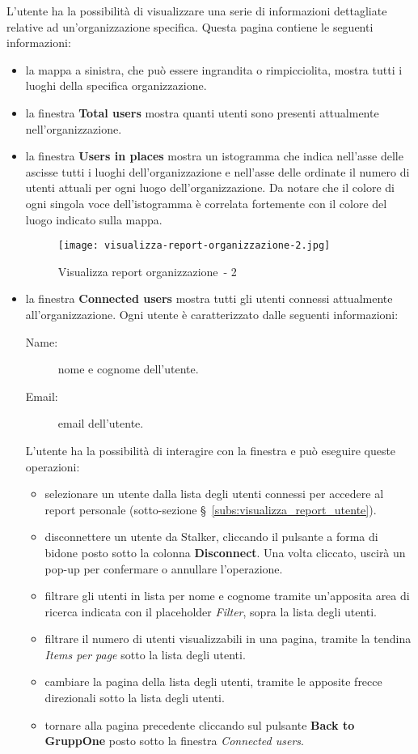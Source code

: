 \documentclass[../manuale-utente.tex]{subfiles}
\begin{document}
L'utente ha la possibilità di visualizzare una serie di informazioni dettagliate relative ad un'organizzazione specifica.
Questa pagina contiene le seguenti informazioni:
\begin{itemize}
  \item la mappa a sinistra, che può essere ingrandita o rimpicciolita, mostra tutti i luoghi della specifica organizzazione.
  \item la finestra \textbf{Total users} mostra quanti utenti sono presenti attualmente nell'organizzazione.
  \item la finestra \textbf{Users in places} mostra un istogramma che indica nell'asse delle ascisse tutti i luoghi dell'organizzazione e nell'asse delle ordinate il numero di utenti attuali per ogni luogo dell'organizzazione. Da notare che il colore di ogni singola voce dell'istogramma è correlata fortemente con il colore del luogo indicato sulla mappa.
  \begin{figure}[H]
    \centering
    \texttt{[image: visualizza-report-organizzazione-2.jpg]}
    \caption{Visualizza report organizzazione~- 2}%
    \label{fig:web_app_visualizza-report-organizzazione-2}
  \end{figure}
  \item la finestra \textbf{Connected users} mostra tutti gli utenti connessi attualmente all'organizzazione.
  Ogni utente è caratterizzato dalle seguenti informazioni:
  \begin{description}
    \item[Name:] nome e cognome dell'utente.
    \item[Email:] email dell'utente.
  \end{description}
  L'utente ha la possibilità di interagire con la finestra e può eseguire queste operazioni:
  \begin{itemize}
    \item selezionare un utente dalla lista degli utenti connessi per accedere al report personale (sotto-sezione §~\ref{subs:visualizza_report_utente}).
    \item disconnettere un utente da Stalker, cliccando il pulsante a forma di bidone posto sotto la colonna \textbf{Disconnect}. Una volta cliccato, uscirà un pop-up per confermare o annullare l'operazione.
    \item filtrare gli utenti in lista per nome e cognome tramite un'apposita area di ricerca indicata con il placeholder \textit{Filter}, sopra la lista degli utenti.
    \item filtrare il numero di utenti visualizzabili in una pagina, tramite la tendina \textit{Items per page} sotto la lista degli utenti.
    \item cambiare la pagina della lista degli utenti, tramite le apposite frecce direzionali sotto la lista degli utenti.
    \item tornare alla pagina precedente cliccando sul pulsante \textbf{Back to GruppOne} posto sotto la finestra \textit{Connected users}.
  \end{itemize}
\end{itemize}
\end{document}
